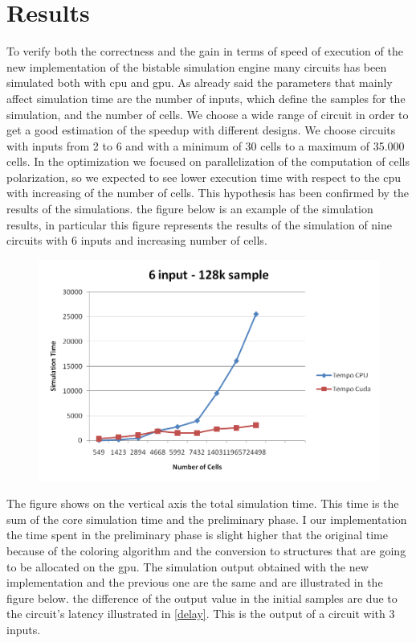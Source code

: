 \chapter{Results}\label{sec:results}
To verify both the correctness and the gain in terms of speed of execution of the new implementation of the bistable simulation engine many circuits has been simulated both with cpu and gpu.
As already said the parameters that mainly affect simulation time are the number of inputs, which define the samples for the simulation, and the number of cells. We choose a wide range of circuit in order to get a good estimation of the speedup with different designs. We choose circuits with inputs from 2 to 6 and with a minimum of 30 cells to a maximum of 35.000 cells. \newline
In the optimization we focused on parallelization of the computation of cells polarization, so we expected to see lower execution time with respect to the cpu with increasing of the number of cells. This hypothesis has been confirmed by the results of the simulations. the figure below is an example of the simulation results, in particular this figure represents the results of the simulation of nine circuits with 6 inputs and increasing number of cells.

\begin{figure}
\centering
\includegraphics[scale=0.6]{img/graph5.png}
\label{graph5}
\end{figure}

The figure shows on the vertical axis the total simulation time. This time is the sum of the core simulation time and the preliminary phase. I our implementation the time spent in the preliminary phase is slight higher that the original time because of the coloring algorithm and the conversion to structures that are going to be allocated on the gpu.\newline
The simulation output obtained with the new implementation and the previous one are the same and are illustrated in the figure below. the difference of the output value in the initial samples are due to the circuit's latency illustrated in \ref{delay}. This is the output of a circuit with 3 inputs.

